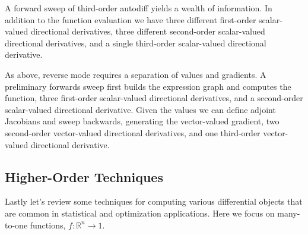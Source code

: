 A forward sweep of third-order autodiff yields a wealth of information.  In addition
to the function evaluation we have three different first-order scalar-valued directional 
derivatives, three different second-order scalar-valued directional derivatives,
and a single third-order scalar-valued directional derivative.

As above, reverse mode requires a separation of values and gradients.  A
preliminary forwards sweep first builds the expression graph and computes the
function, three first-order scalar-valued directional derivatives, and a second-order
scalar-valued directional derivative.  Given the values we can define adjoint
Jacobians and sweep backwards, generating the vector-valued gradient,
two second-order vector-valued directional derivatives, and one third-order
vector-valued directional derivative.

\subsection*{Higher-Order Techniques}

Lastly let's review some techniques for computing various differential objects that
are common in statistical and optimization applications.  Here we focus on many-
to-one functions, $f : \mathbb{R}^{n} \rightarrow 1$.

